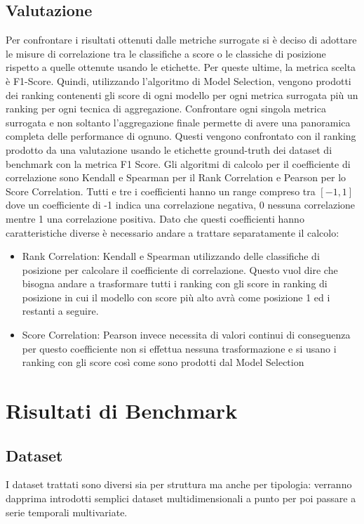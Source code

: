 \subsection{Valutazione}
Per confrontare i risultati ottenuti dalle metriche surrogate si è deciso di adottare le misure di correlazione tra le classifiche a score o le classiche di posizione rispetto a quelle ottenute usando le etichette. Per queste ultime, la metrica scelta è F1-Score.
Quindi, utilizzando l'algoritmo di Model Selection, vengono prodotti dei ranking contenenti gli score di ogni modello per ogni metrica surrogata più un ranking per ogni tecnica di aggregazione. Confrontare ogni singola metrica surrogata e non soltanto l'aggregazione finale permette di avere una panoramica completa delle performance di ognuno.
Questi vengono confrontato con il ranking prodotto da una valutazione usando le etichette ground-truth dei dataset di benchmark con la metrica F1 Score.
Gli algoritmi di calcolo per il coefficiente di correlazione sono Kendall e Spearman per il Rank Correlation e Pearson per lo Score Correlation. Tutti e tre i coefficienti hanno un range compreso tra $[-1,1]$ dove un coefficiente di -1 indica una correlazione negativa, 0 nessuna correlazione mentre 1 una correlazione positiva. 
Dato che questi coefficienti hanno caratteristiche diverse è necessario andare a trattare separatamente il calcolo:
\begin{itemize}
	\item Rank Correlation: Kendall e Spearman utilizzando delle classifiche di posizione per calcolare il coefficiente di correlazione. Questo vuol dire che bisogna andare a trasformare tutti i ranking con gli score in ranking di posizione in cui il modello con score più alto avrà come posizione 1 ed i restanti a seguire.
	\item Score Correlation: Pearson invece necessita di valori continui di conseguenza per questo coefficiente non si effettua nessuna trasformazione e si usano i ranking con gli score così come sono prodotti dal Model Selection
\end{itemize}

 

\newpage
\section{Risultati di Benchmark}
\subsection{Dataset}
I dataset trattati sono diversi sia per struttura ma anche per tipologia: verranno dapprima introdotti semplici dataset multidimensionali a punto per poi passare a serie temporali multivariate. 

